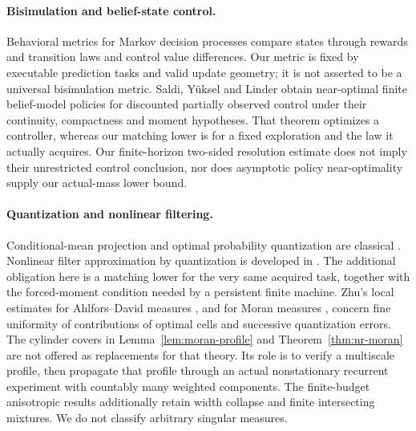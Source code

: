 \paragraph{Bisimulation and belief-state control.}
Behavioral metrics for Markov decision processes \cite{ferns} compare states through rewards and transition laws and control value differences. Our metric is fixed by executable prediction tasks and valid update geometry; it is not asserted to be a universal bisimulation metric. Saldi, Y\"uksel and Linder \cite[Assumption 1 and Theorem 3]{saldi} obtain near-optimal finite belief-model policies for discounted partially observed control under their continuity, compactness and moment hypotheses. That theorem optimizes a controller, whereas our matching lower is for a fixed exploration and the law it actually acquires. Our finite-horizon two-sided resolution estimate does not imply their unrestricted control conclusion, nor does asymptotic policy near-optimality supply our actual-mass lower bound.

\paragraph{Quantization and nonlinear filtering.}
Conditional-mean projection and optimal probability quantization are classical \cite{graf}. Nonlinear filter approximation by quantization is developed in \cite{pages,sellami,feuer}. The additional obligation here is a matching lower for the very same acquired task, together with the forced-moment condition needed by a persistent finite machine. Zhu's local estimates for Ahlfors--David measures \cite{zhu}, and for Moran measures \cite{zhu-moran}, concern fine uniformity of contributions of optimal cells and successive quantization errors. The cylinder covers in Lemma~\ref{lem:moran-profile} and Theorem~\ref{thm:nr-moran} are not offered as replacements for that theory. Its role is to verify a multiscale profile, then propagate that profile through an actual nonstationary recurrent experiment with countably many weighted components. The finite-budget anisotropic results additionally retain width collapse and finite intersecting mixtures. We do not classify arbitrary singular measures.

